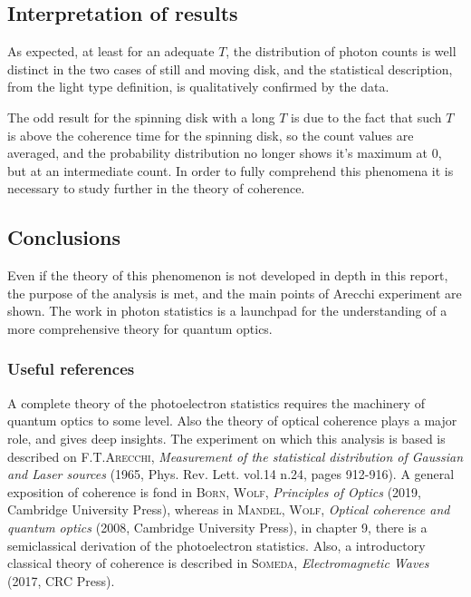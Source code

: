 \documentclass[10pt, a4paper, final]{article}
\begin{document}
\begin{multicols}{2}
     
\subsection*{Interpretation of results}
As expected, at least for an adequate $T$, the distribution of photon counts is well distinct in the two cases of still and moving disk, and the statistical description, from the light type definition, is qualitatively confirmed by the data.

The odd result for the spinning disk with a long $T$ is due to the fact that such $T$ is above the coherence time for the spinning disk, so the count values are averaged, and the probability distribution no longer shows it's maximum at 0, but at an intermediate count. In order to fully comprehend this phenomena it is necessary to study further in the theory of coherence.


\subsection*{Conclusions}
Even if the theory of this phenomenon is not developed in depth in this report, the purpose of the analysis is met, and the main points of Arecchi experiment are shown. The work in photon statistics is a launchpad for the understanding of a more comprehensive theory for quantum optics.

\subsubsection*{Useful references}
A complete theory of the photoelectron statistics requires the machinery of quantum optics to some level. Also the theory of optical coherence plays a major role, and gives deep insights. 
The experiment on which this analysis is based is described on \textsc{F.T.Arecchi}, \emph{Measurement of the statistical distribution of Gaussian and Laser sources} (1965, Phys. Rev. Lett. vol.14 n.24, pages 912-916). 
A general exposition of coherence is fond in \textsc{Born, Wolf}, \emph{Principles of Optics} (2019, Cambridge University Press), whereas in \textsc{Mandel, Wolf}, \emph{Optical coherence and quantum optics} (2008, Cambridge University Press), in chapter 9, there is a semiclassical derivation of the photoelectron statistics.
Also, a introductory classical theory of coherence is described in \textsc{Someda}, \emph{Electromagnetic Waves} (2017, CRC Press).


\end{multicols}
\end{document}
